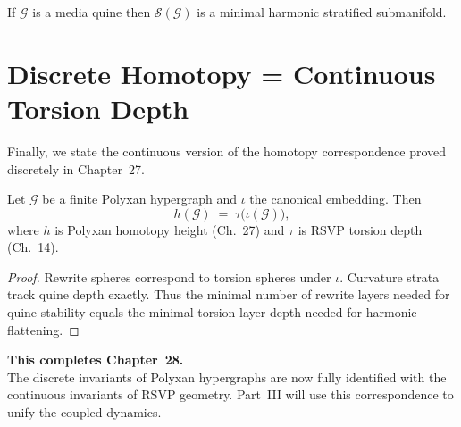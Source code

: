 \begin{corollary}
If $\mathcal{G}$ is a media quine then
$\mathcal{S}(\mathcal{G})$ is a minimal harmonic stratified submanifold.
\end{corollary}

\section{Discrete Homotopy = Continuous Torsion Depth}

Finally, we state the continuous version of the homotopy correspondence
proved discretely in Chapter~27.

\begin{theorem}
\label{thm:28-homotopytorsion}
Let $\mathcal{G}$ be a finite Polyxan hypergraph and
$\iota$ the canonical embedding.
Then
\[
h(\mathcal{G})
  \;=\;
\tau\bigl(\iota(\mathcal{G})\bigr),
\]
where $h$ is Polyxan homotopy height (Ch.~27)  
and $\tau$ is RSVP torsion depth (Ch.~14).
\end{theorem}

\begin{proof}
Rewrite spheres correspond to torsion spheres under $\iota$.
Curvature strata track quine depth exactly.
Thus the minimal number of rewrite layers needed for quine stability
equals the minimal torsion layer depth needed for harmonic flattening.
\end{proof}

\bigskip

\begin{center}
\textbf{This completes Chapter~28.}\\[4pt]
The discrete invariants of Polyxan hypergraphs are now fully identified with  
the continuous invariants of RSVP geometry.  
Part~III will use this correspondence to unify the coupled dynamics.
\end{center}

